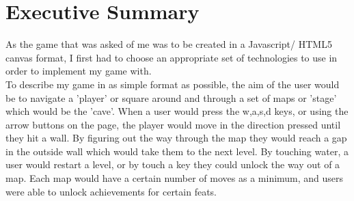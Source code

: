 \documentclass[a4paper]{article}
\begin{document}
\section{Executive Summary}
As the game that was asked of me was to be created in a Javascript/ HTML5 canvas
format, I first had to choose an appropriate set of technologies to use in order
to implement my game with. 
\\To describe my game in as simple format as possible, the aim of the user would
be to navigate a 'player' or square around and through a set of maps or 'stage'
which would be the 'cave'. When a user would press the w,a,s,d keys, or using
the arrow buttons on the page, the player would move in the direction pressed
until they hit a wall. By figuring out the way through the map they would reach
a gap in the outside wall which would take them to the next level. By touching
water, a user would restart a level, or by touch a key they could unlock the way
out of a map. Each map would have a certain number of moves as a minimum, and
users were able to unlock achievements for certain feats.
\end{document}

